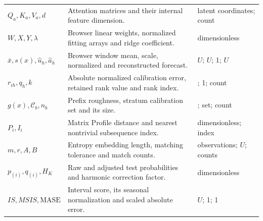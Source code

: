 \begin{longtable}{>{\raggedright\arraybackslash}p{}>{\raggedright\arraybackslash}p{}>{\raggedright\arraybackslash}p{}}
$Q_a,K_a,V_a,d$ & Attention matrices and their internal feature dimension. & latent coordinates; count\\
$W,X,Y,\lambda$ & Browser linear weights, normalized fitting arrays and ridge coefficient. & dimensionless\\
$\bar x,s(x),\widehat u_h,\widehat a_h$ & Browser window mean, scale, normalized and reconstructed forecast. & $U$; $U$; 1; $U$\\
$r_{ih},q_h,k$ & Absolute normalized calibration error, retained rank value and rank index. & 1; 1; count\\
$g(x),\mathcal C_b,n_b$ & Prefix roughness, stratum calibration set and its size. & 1; set; count\\
$P_i,I_i$ & Matrix Profile distance and nearest nontrivial subsequence index. & dimensionless; index\\
$m,r,A,B$ & Entropy embedding length, matching tolerance and match counts. & observations; $U$; counts\\
$p_{(i)},q_{(i)},H_K$ & Raw and adjusted test probabilities and harmonic correction factor. & dimensionless\\
$IS,MSIS,\mathrm{MASE}$ & Interval score, its seasonal normalization and scaled absolute error. & $U$; 1; 1\\
\bottomrule
\end{longtable}
